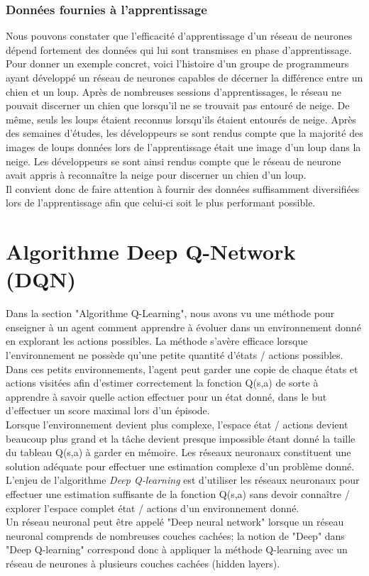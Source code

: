 \documentclass[11pt,a4paper]{report}
\begin{document}
  \subsubsection{Données fournies à l'apprentissage}
  
    \par Nous pouvons constater que l’efficacité d'apprentissage d'un réseau de neurones dépend fortement des données qui lui sont transmises en phase d’apprentissage. Pour donner un exemple concret, voici l'histoire d'un groupe de programmeurs ayant développé un réseau de neurones capables de décerner la différence entre un chien et un loup. Après de nombreuses sessions d'apprentissages, le réseau ne pouvait discerner un chien que lorsqu'il ne se trouvait pas entouré de neige. De même, seuls les loups étaient reconnus lorsqu'ils étaient entourés de neige. Après des semaines d'études, les développeurs se sont rendus compte que la majorité des images de loups données lors de l'apprentissage était une image d'un loup dans la neige. Les développeurs se sont ainsi rendus compte que le réseau de neurone avait appris à reconnaître la neige pour discerner un chien d'un loup. \\
  Il convient donc de faire attention à fournir des données suffisamment diversifiées lors de l'apprentissage afin que celui-ci soit le plus performant possible. 
    
  \section{Algorithme Deep Q-Network (DQN)}
  
    \par Dans la section "Algorithme Q-Learning", nous avons vu une méthode pour enseigner à un agent comment apprendre à évoluer dans un environnement donné en explorant les actions possibles. La méthode s'avère efficace lorsque l'environnement ne possède qu'une petite quantité d'états / actions possibles. Dans ces petits environnements, l'agent peut garder une copie de chaque états et actions visitées afin d'estimer correctement la fonction Q(s,a) de sorte à apprendre à savoir quelle action effectuer pour un état donné, dans le but d'effectuer un score maximal lors d'un épisode. \\ 
   Lorsque l'environnement devient plus complexe, l'espace état / actions devient beaucoup plus grand et la tâche devient presque impossible étant donné la taille du tableau Q(s,a) à garder en mémoire. Les réseaux neuronaux constituent une solution  adéquate pour effectuer une estimation complexe d'un problème donné. L'enjeu de l'algorithme \textit{Deep Q-learning} est d'utiliser les réseaux neuronaux pour effectuer une estimation suffisante de la fonction Q(s,a) sans devoir connaître / explorer l'espace complet état / actions d'un environnement donné. \\
   Un réseau neuronal peut être appelé "Deep neural network" lorsque un réseau neuronal comprends de nombreuses couches cachées; la notion de "Deep" dans "Deep Q-learning" correspond donc à appliquer la méthode Q-learning avec un réseau de neurones à plusieurs couches cachées (hidden layers). 
   
\end{document}
